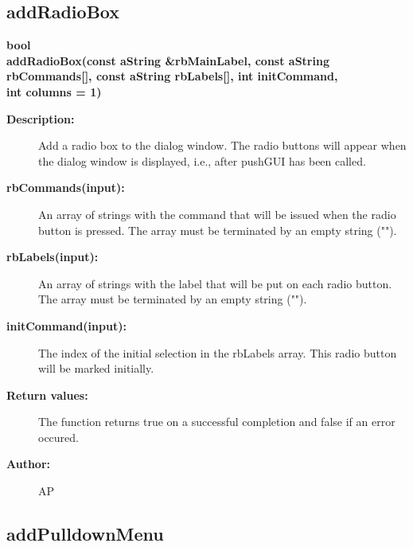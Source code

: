 \subsection{addRadioBox}
 
\begin{flushleft} \textbf{%
bool  \\ 
\settowidth{\DialogDataIncludeArgIndent}{addRadioBox(}%
addRadioBox(const aString \&rbMainLabel, const aString rbCommands[], const aString rbLabels[], int initCommand,\\ 
\hspace{\DialogDataIncludeArgIndent}int columns  = 1)
}\end{flushleft}
\begin{description}
\item[{\bf Description:}]  Add a radio box to the dialog window. The radio buttons will appear when the
 dialog window is displayed, i.e., after pushGUI has been called.

\item[{\bf rbCommands(input):}]  An array of strings with the command that will be issued when the radio 
  button is pressed. The array must be terminated by an empty string ("").
\item[{\bf rbLabels(input):}]  An array of strings with the label that will be put on each radio button. 
 The array must be terminated by an empty string ("").
\item[{\bf initCommand(input):}]  The index of the initial selection in the rbLabels array. This radio 
  button will be marked initially.
\item[{\bf Return values:}]  The function returns true on a successful completion and false if an error occured.
\item[{\bf Author:}]  AP
\end{description}
\subsection{addPulldownMenu}
 
